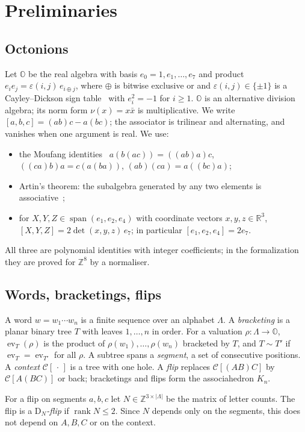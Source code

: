 \documentclass[11pt,a4paper]{article}
\theoremstyle{definition}
\theoremstyle{remark}
\newcommand{\OO}{\mathbb{O}}
\newcommand{\ZZ}{\mathbb{Z}}
\newcommand{\RR}{\mathbb{R}}
\newcommand{\assoc}[3]{[#1,#2,#3]}
\newcommand{\DN}{\mathrm{D}_N}
\newcommand{\ctx}{\mathcal{C}}
\DeclareMathOperator{\rank}{rank}
\DeclareMathOperator{\ev}{ev}
\begin{document}
\section{Preliminaries}\label{sec:prelim}

\subsection{Octonions}
Let $\OO$ be the real algebra with basis $e_0=1,e_1,\dots,e_7$ and product
$e_ie_j=\varepsilon(i,j)\,e_{i\oplus j}$, where $\oplus$ is bitwise exclusive or and
$\varepsilon(i,j)\in\{\pm1\}$ is a Cayley--Dickson sign table~\cite{Bae02} with $e_i^2=-1$ for $i\ge1$.
$\OO$ is an alternative division algebra; its norm form $\nu(x)=x\bar x$ is multiplicative. We write
$\assoc abc=(ab)c-a(bc)$; the associator is trilinear and alternating, and vanishes when one argument is
real. We use:
\begin{itemize}
  \item the Moufang identities~\cite{Mou35} $a(b(ac))=((ab)a)c$, $((ca)b)a=c(a(ba))$,
    $(ab)(ca)=a((bc)a)$;
  \item Artin's theorem: the subalgebra generated by any two elements is associative~\cite{Sch66,ZSSS82};
  \item for $X,Y,Z\in\operatorname{span}(e_1,e_2,e_4)$ with coordinate vectors $x,y,z\in\RR^3$,
    $\assoc XYZ=2\det(x,y,z)\,e_7$; in particular $\assoc{e_1}{e_2}{e_4}=2e_7$.
\end{itemize}
All three are polynomial identities with integer coefficients; in the formalization they are proved for
$\ZZ^8$ by a normaliser.

\subsection{Words, bracketings, flips}
A word $w=w_1\cdots w_n$ is a finite sequence over an alphabet $\Lambda$. A \emph{bracketing} is a
planar binary tree $T$ with leaves $1,\dots,n$ in order. For a valuation $\rho\colon\Lambda\to\OO$,
$\ev_T(\rho)$ is the product of $\rho(w_1),\dots,\rho(w_n)$ bracketed by $T$, and $T\sim T'$ if
$\ev_T=\ev_{T'}$ for all $\rho$. A subtree spans a \emph{segment}, a set of consecutive positions. A
\emph{context} $\ctx[\,\cdot\,]$ is a tree with one hole. A \emph{flip} replaces $\ctx[(AB)C]$ by
$\ctx[A(BC)]$ or back; bracketings and flips form the associahedron $K_n$.

For a flip on segments $a,b,c$ let $N\in\ZZ^{3\times\lvert\Lambda\rvert}$ be the matrix of letter counts.
The flip is a \emph{$\DN$-flip} if $\rank N\le2$. Since $N$ depends only on the segments, this does not
depend on $A,B,C$ or on the context.
\end{document}
